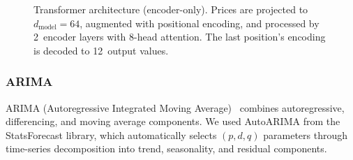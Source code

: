 \documentclass[conference]{IEEEtran}
\begin{document}
\begin{figure}[htbp]
{}%
  \caption{Transformer architecture (encoder-only). Prices are projected to $d_{\text{model}}=64$, augmented with positional encoding, and processed by 2~encoder layers with 8-head attention. The last position's encoding is decoded to 12~output values.}
  \label{fig:transformer}
\end{figure}

\subsubsection{ARIMA}

ARIMA (Autoregressive Integrated Moving Average)~\cite{boxjenkins} combines autoregressive, differencing, and moving average components. We used AutoARIMA from the StatsForecast library, which automatically selects $(p, d, q)$ parameters through time-series decomposition into trend, seasonality, and residual components.
\end{document}
